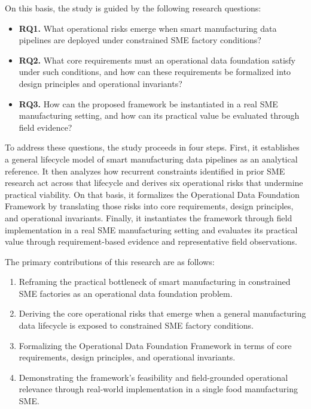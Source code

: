 \documentclass[systems,article,submit,pdftex,moreauthors]{Definitions/mdpi}
\begin{document}
On this basis, the study is guided by the following research questions:

\begin{itemize}
    \item \textbf{RQ1.} What operational risks emerge when smart manufacturing data pipelines are deployed under constrained SME factory conditions?
    \item \textbf{RQ2.} What core requirements must an operational data foundation satisfy under such conditions, and how can these requirements be formalized into design principles and operational invariants?
    \item \textbf{RQ3.} How can the proposed framework be instantiated in a real SME manufacturing setting, and how can its practical value be evaluated through field evidence?
\end{itemize}

To address these questions, the study proceeds in four steps. First, it establishes a general lifecycle model of smart manufacturing data pipelines as an analytical reference. It then analyzes how recurrent constraints identified in prior SME research act across that lifecycle and derives six operational risks that undermine practical viability. On that basis, it formalizes the Operational Data Foundation Framework by translating those risks into core requirements, design principles, and operational invariants. Finally, it instantiates the framework through field implementation in a real SME manufacturing setting and evaluates its practical value through requirement-based evidence and representative field observations.

The primary contributions of this research are as follows:

\begin{enumerate}
    \item Reframing the practical bottleneck of smart manufacturing in constrained SME factories as an operational data foundation problem.
    \item Deriving the core operational risks that emerge when a general manufacturing data lifecycle is exposed to constrained SME factory conditions.
    \item Formalizing the Operational Data Foundation Framework in terms of core requirements, design principles, and operational invariants.
    \item Demonstrating the framework's feasibility and field-grounded operational relevance through real-world implementation in a single food manufacturing SME.
\end{enumerate}
\end{document}
